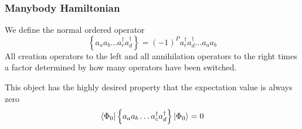 \begin{frame}[fragile]
    \frametitle{Manybody Hamiltonian}

    We define the normal ordered operator
    \begin{equation*}
        \left\{a_a a_b \ldots a_c^\dagger a_d^\dagger\right\} = 
            (-1)^P a_c^\dagger a_d^\dagger \ldots a_a a_b
    \end{equation*}
    All creation operators to the left and all annihilation operators to the right times a factor determined by how many operators have been switched. 

    This object has the highly desired property that the expectation value is always zero
    \begin{equation*}
        \langle \Phi_0 | \left\{a_a a_b \ldots a_c^\dagger a_d^\dagger\right\} |\Phi_0\rangle = 0
    \end{equation*}

\end{frame}

